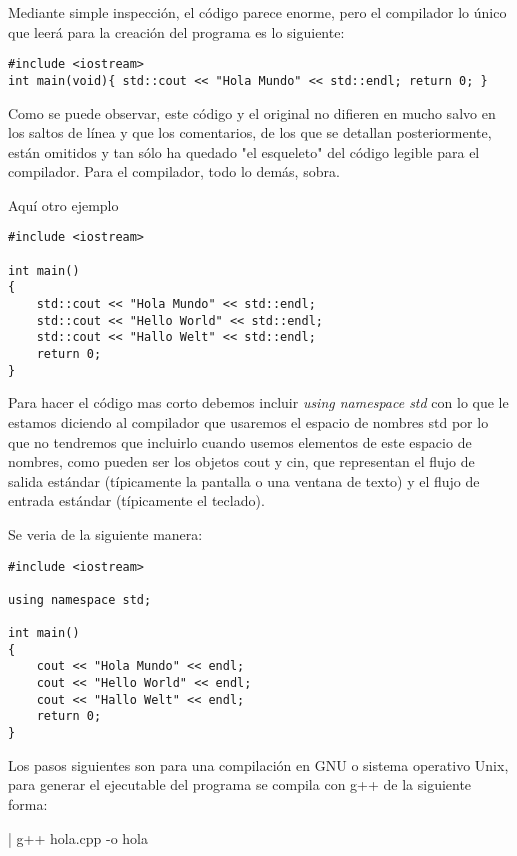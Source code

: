 Mediante simple inspección, el código parece enorme, pero el compilador lo único que leerá para la creación del programa es lo siguiente:
\begin{lstlisting}[style=Cpp, label=hola-mundo-compilador, caption=Hola Mundo Comp]
#include <iostream>
int main(void){ std::cout << "Hola Mundo" << std::endl; return 0; }
\end{lstlisting}

Como se puede observar, este código y el original no difieren en mucho salvo en los saltos de línea y que los comentarios, de los que se detallan posteriormente, están omitidos y tan sólo ha quedado "el esqueleto" del código legible para el compilador. Para el compilador, todo lo demás, sobra.

Aquí otro ejemplo

\begin{lstlisting}[style=Cpp, label=hola-mundo-compilador, caption=Hola Mundo Comp]
#include <iostream>

int main()
{
    std::cout << "Hola Mundo" << std::endl;
    std::cout << "Hello World" << std::endl;
    std::cout << "Hallo Welt" << std::endl;
    return 0;
}
\end{lstlisting}

Para hacer el código mas corto debemos incluir \textit{using namespace std} con lo que le estamos diciendo al compilador que usaremos el espacio de nombres std por lo que no tendremos que incluirlo cuando usemos elementos de este espacio de nombres, como pueden ser los objetos cout y cin, que representan el flujo de salida estándar (típicamente la pantalla o una ventana de texto) y el flujo de entrada estándar (típicamente el teclado).

Se veria de la siguiente manera:

\begin{lstlisting}[style=Cpp, label=hola-mundo-compilador, caption=Hola Mundo Comp]
#include <iostream>

using namespace std;

int main()
{
    cout << "Hola Mundo" << endl;
    cout << "Hello World" << endl;
    cout << "Hallo Welt" << endl;
    return 0;
}
\end{lstlisting}

Los pasos siguientes son para una compilación en GNU o sistema operativo Unix, para generar el ejecutable del programa se compila con g++ de la siguiente forma:

\begin{listing}[style=consola, numbers=none,label=some-code,caption=Some Code]
| g++ hola.cpp -o hola
\end{listing}

